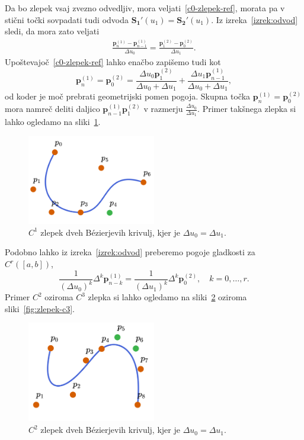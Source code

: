 \documentclass[isrm2, tisk]{fmfdelo}
\newcommand{\p}{\mathbf{p}}
\begin{document}
    \noindent Da bo zlepek vsaj zvezno odvedljiv, mora veljati~\eqref{c0-zlepek-ref}, morata pa v stični točki sovpadati tudi odvoda $\mathbf{S_1}'(u_1) = \mathbf{S_2}'(u_1)$.
    Iz izreka~\ref{izrek:odvod} sledi, da mora zato veljati
    \begin{align}
        \frac{\p_{n}^{(1)} - \p_{n-1}^{(1)}}{\Delta u_0} = \frac{\p_{1}^{(2)} - \p_{0}^{(2)}}{\Delta u_1}.
    \end{align}
    Upoštevajoč~\eqref{c0-zlepek-ref} lahko enačbo zapišemo tudi kot
    $$\p_{n}^{(1)} =  \p_{0}^{(2)}  = \frac{\Delta u_0\p_{1}^{(2)}}{\Delta u_0+\Delta u_1} + \frac{\Delta u_1\p_{n-1}^{(1)}}{\Delta u_0+\Delta u_1} ,$$
    od koder je moč prebrati geometrijski pomen pogoja.
    Skupna točka $\p_{n}^{(1)} =  \p_{0}^{(2)}$ mora namreč deliti daljico $\p_{n-1}^{(1)}\p_{1}^{(2)}$ v razmerju $\frac{\Delta u_0}{\Delta u_1}$.
    Primer takšnega zlepka si lahko ogledamo na sliki~\ref{fig:zlepek-c1}.
    \begin{figure}[h]
        \centering
        \includegraphics[width = 0.50\textwidth]{images/zlepek-c1}
        \caption{$C^1$ zlepek dveh Bézierjevih krivulj, kjer je $\Delta u_0=\Delta u_1$.}
        \label{fig:zlepek-c1}
    \end{figure}
    Podobno lahko iz izreka~\ref{izrek:odvod} preberemo pogoje gladkosti za $C^r([a,b])$,
    $$ \frac{1}{(\Delta u_0)^k}\Delta^k\p^{(1)}_{n-k}= \frac{1}{(\Delta u_1)^k}\Delta^k\p^{(2)}_{0}, \quad k=0,\dots,r.$$
    Primer $C^2$ oziroma $C^3$ zlepka si lahko ogledamo na sliki~\ref{fig:zlepek-c2} oziroma sliki~\ref{fig:zlepek-c3}.
    \begin{figure}[h]
        \centering
        \includegraphics[width = 0.50\textwidth]{images/zlepek-c2}
        \caption{$C^2$ zlepek dveh Bézierjevih krivulj, kjer je $\Delta u_0=\Delta u_1$.}
        \label{fig:zlepek-c2}
    \end{figure}
\end{document}

